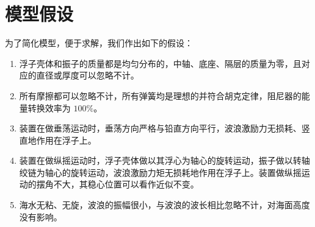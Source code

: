 \section{模型假设}

为了简化模型，便于求解，我们作出如下的假设：

\begin{enumerate}
    \item 浮子壳体和振子的质量都是均匀分布的，中轴、底座、隔层的质量为零，且对应的直径或厚度可以忽略不计。
    \item 所有摩擦都可以忽略不计，所有弹簧均是理想的并符合胡克定律，阻尼器的能量转换效率为 $100\%$。
    \item 装置在做垂荡运动时，垂荡方向严格与铅直方向平行，波浪激励力无损耗、竖直地作用在浮子上。
    \item 装置在做纵摇运动时，浮子壳体做以其浮心为轴心的旋转运动，振子做以转轴绞链为轴心的旋转运动，波浪激励力矩无损耗地作用在浮子上。装置做纵摇运动的摆角不大，其稳心位置可以看作近似不变。
    \item 海水无粘、无旋，波浪的振幅很小，与波浪的波长相比忽略不计，对海面高度没有影响。
\end{enumerate}